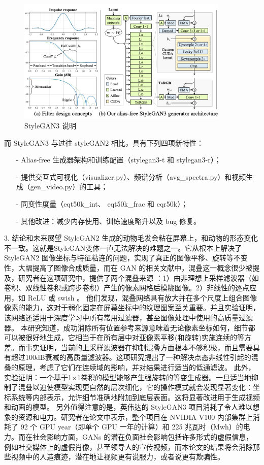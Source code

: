 \begin{figure}[htb]
\centering 
\includegraphics[width=0.9\textwidth]{img/m2t22.png} 
\caption{StyleGAN3 说明}
\label{Test}
\end{figure}

而 StyleGAN3 与过往 styleGAN2 相比，具有下列四项新特性：

\begin{enumerate}
 \item [-] Alias-free 生成器架构和训练配置（stylegan3-t 和 stylegan3-r）；
 \item [-] 提供交互式可视化（visualizer.py）、频谱分析（avg\_spectra.py）和视频生成（gen\_video.py）的工具；
 \item [-] 同变性度量（eqt50k\_int、 eqt50k\_frac 和 eqr50k）；
 \item [-] 其他改进：减少内存使用、训练速度略升以及 bug 修复。
\end{enumerate}

3. 结论和未来展望
StyleGAN2 生成的动物毛发会粘在屏幕上，和动物的形态变化不一致。这就是StyleGAN变体一直无法解决的难题之一。它从根本上解决了StyleGAN2 图像坐标与特征粘连的问题，实现了真正的图像平移、旋转等不变性，大幅提高了图像合成质量，而在 GAN 的相关文献中，混叠这一概念很少被提及，研究者在这项研究中，提供了两个混叠来源 ：1）由非理想上采样滤波器（如卷积、双线性卷积或跨步卷积）产生的像素网格后模糊图像。2）非线性的逐点应用，如 ReLU 或 swish 。
他们发现，混叠网络具有放大并在多个尺度上组合图像像素的能力，这对于弱化固定在屏幕坐标中的纹理图案至关重要。并且实验证明，该网络还适用于深度学习中所有常用过滤器，甚至图像处理中使用的高质量过滤器。
本研究知道，成功消除所有位置参考来源意味着无论像素坐标如何，细节都可以被很好地生成，它相当于在所有层中对亚像素平移(和旋转)实施连续的等方差。而事实证明，当前的上采样滤波器在抑制混叠方面根本不够积极，而且需要具有超过100dB衰减的高质量滤波器。这项研究提出了一种解决点态非线性引起的混叠的原理，考虑了它们在连续域的影响，并对结果进行适当的低通滤波。
此外，实验证明：一个基于1×1卷积的模型能够产生强旋转的等变生成器。一旦适当地抑制了混叠以迫使模型实现更自然的层次细化，它的操作模式就会发现显著变化：坐标系统等内部表示，允许细节准确地附加到底层表面。这将显著改进用于生成视频和动画的模型。 另外值得注意的是，英伟达的 StyleGAN3 项目消耗了令人难以想象的资源和电力。研究者在论文中表示，整个项目在 NVIDIA V100 内部集群上消耗了 92 个 GPU year（即单个 GPU 一年的计算）和 225 兆瓦时（Mwh）的电力。而在社会影响方面，GANs 的潜在负面社会影响包括许多形式的虚假信息，例如社交媒体上的虚假肖像，甚至领导人的宣传视频，而本论文的结果将会消除那些视频中的人造痕迹，潜在地让视频更有说服力，或者说更有欺骗性。

